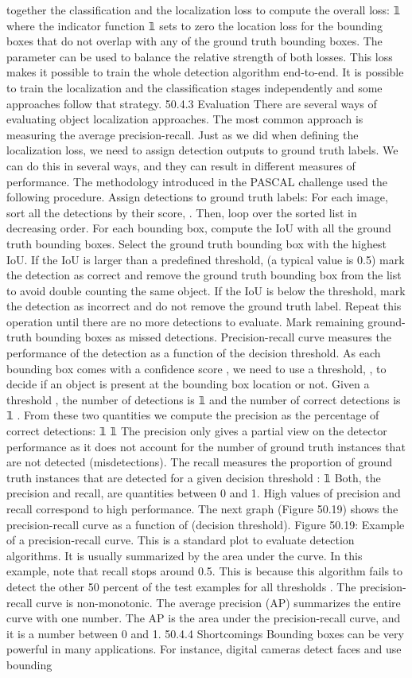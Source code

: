 together the classification and the localization loss to compute the overall loss: 𝟙 where the indicator function 𝟙 sets to zero the location loss for the bounding boxes that do not overlap with any of the ground truth bounding boxes. The parameter can be used to balance the relative strength of both losses. This loss makes it possible to train the whole detection algorithm end-to-end. It is possible to train the localization and the classification stages independently and some approaches follow that strategy. 50.4.3 Evaluation There are several ways of evaluating object localization approaches. The most common approach is measuring the average precision-recall. Just as we did when defining the localization loss, we need to assign detection outputs to ground truth labels. We can do this in several ways, and they can result in different measures of performance. The methodology introduced in the PASCAL challenge used the following procedure. Assign detections to ground truth labels: For each image, sort all the detections by their score, . Then, loop over the sorted list in decreasing order. For each bounding box, compute the IoU with all the ground truth bounding boxes. Select the ground truth bounding box with the highest IoU. If the IoU is larger than a predefined threshold, (a typical value is 0.5) mark the detection as correct and remove the ground truth bounding box from the list to avoid double counting the same object. If the IoU is below the threshold, mark the detection as incorrect and do not remove the ground truth label. Repeat this operation until there are no more detections to evaluate. Mark remaining ground-truth bounding boxes as missed detections. Precision-recall curve measures the performance of the detection as a function of the decision threshold. As each bounding box comes with a confidence score , we need to use a threshold, , to decide if an object is present at the bounding box location or not. Given a threshold , the number of detections is 𝟙 and the number of correct detections is 𝟙 . From these two quantities we compute the precision as the percentage of correct detections: 𝟙 𝟙 The precision only gives a partial view on the detector performance as it does not account for the number of ground truth instances that are not detected (misdetections). The recall measures the proportion of ground truth instances that are detected for a given decision threshold : 𝟙 Both, the precision and recall, are quantities between 0 and 1. High values of precision and recall correspond to high performance. The next graph (Figure 50.19) shows the precision-recall curve as a function of (decision threshold). Figure 50.19: Example of a precision-recall curve. This is a standard plot to evaluate detection algorithms. It is usually summarized by the area under the curve. In this example, note that recall stops around 0.5. This is because this algorithm fails to detect the other 50 percent of the test examples for all thresholds . The precision-recall curve is non-monotonic. The average precision (AP) summarizes the entire curve with one number. The AP is the area under the precision-recall curve, and it is a number between 0 and 1. 50.4.4 Shortcomings Bounding boxes can be very powerful in many applications. For instance, digital cameras detect faces and use bounding 